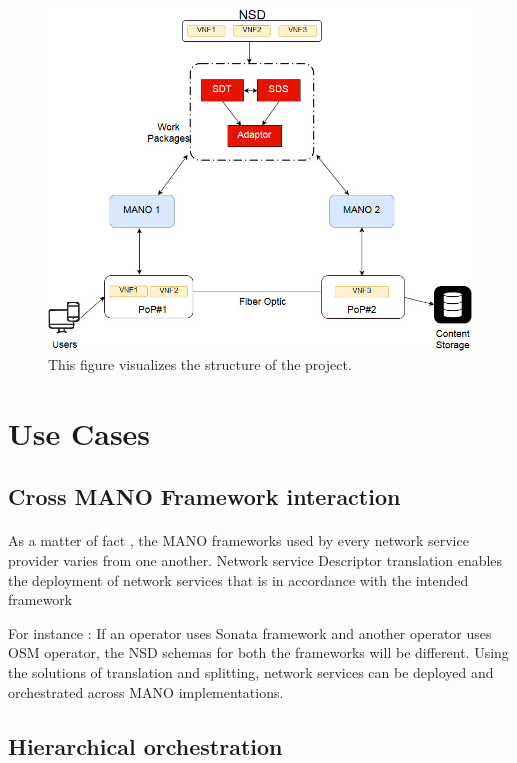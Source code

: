 \begin{figure}
	\centering
	\includegraphics[width=0.7\linewidth]{figures/Structure_Updated1}
	\caption{This figure visualizes the structure of the project. }
	\label{fig:structureupdated1}
\end{figure}


\newpage
\section{Use Cases}

\subsection{Cross MANO Framework interaction}
\paragraph{}

As a matter of fact , the MANO frameworks used by every network service provider varies from one another. 
Network service Descriptor translation enables the deployment of network services that is in accordance with the intended framework

For instance : If an operator uses Sonata framework and another operator uses OSM operator, the NSD schemas for both the frameworks will be different. Using the solutions of translation and splitting, network services can be deployed and orchestrated across MANO implementations.

\subsection{Hierarchical orchestration}
